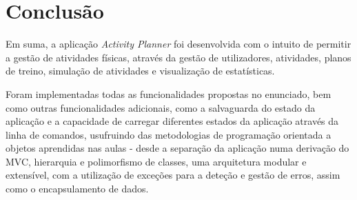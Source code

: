 \documentclass[a4paper,12pt]{scrreprt}
\begin{document}
\chapter{Conclusão}
    Em suma, a aplicação \textit{Activity Planner} foi desenvolvida com o intuito de permitir a gestão de atividades físicas, através da gestão de utilizadores, atividades, planos de treino, simulação de atividades e visualização de estatísticas.

    Foram implementadas todas as funcionalidades propostas no enunciado, bem como outras funcionalidades adicionais, como a salvaguarda do estado da aplicação e a capacidade de carregar diferentes estados da aplicação através da linha de comandos, usufruindo das metodologias de programação orientada a objetos aprendidas nas aulas - desde a separação da aplicação numa derivação do MVC, hierarquia e polimorfismo de classes, uma arquitetura modular e extensível, com a utilização de exceções para a deteção e gestão de erros, assim como o encapsulamento de dados.

\end{document}
